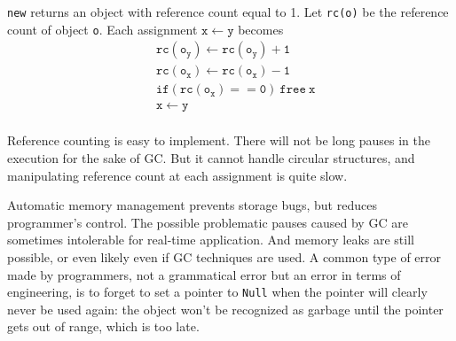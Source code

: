 \texttt{new} returns an object with reference count equal to 1. Let \texttt{rc(o)} be the reference count of object \texttt{o}. Each assignment $\mathtt{x\leftarrow y}$ becomes 
\begin{align*}
&\mathtt{rc(o_y)\leftarrow rc(o_y) + 1}\\
&\mathtt{rc(o_x)\leftarrow rc(o_x) - 1}\\
&\mathtt{if(rc(o_x) == 0)\:free\:x}\\
&\mathtt{x\leftarrow y}\\
\end{align*}

Reference counting is easy to implement. There will not be long pauses in the execution for the sake of GC. But it cannot handle circular structures, and manipulating reference count at each assignment is quite slow. 

Automatic memory management prevents storage bugs, but reduces programmer's control. The possible problematic pauses caused by GC are sometimes intolerable for real-time application. And memory leaks are still possible, or even likely even if GC techniques are used. A common type of error made by programmers, not a grammatical error but an error in terms of engineering, is to forget to set a pointer to \texttt{Null} when the pointer will clearly never be used again: the object won't be recognized as garbage until the pointer gets out of range, which is too late.
\ifx\PREAMBLE\undefined

\fi